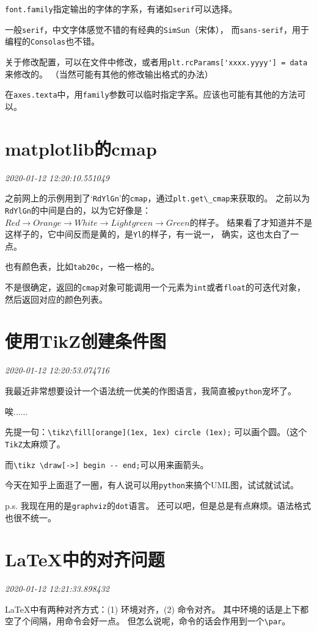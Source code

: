 \documentclass{peterlitsdoc}
\newcommand{\timetx}[1]
    {\par\noindent\emph{\pltgray\small #1}\vspace{2em}}
\newcommand{\vb}{\verb}
\begin{document}
\vb|font.family|指定输出的字体的字系，有诸如\vb|serif|可以选择。

一般\vb|serif|，中文字体感觉不错的有经典的\vb|SimSun|（宋体），
而\vb|sans-serif|，用于编程的\vb|Consolas|也不错。

关于修改配置，可以在文件中修改，或者用\vb|plt.rcParams['xxxx.yyyy'] = data|来修改的。
（当然可能有其他的修改输出格式的办法）

在\vb|axes.texta|中，用\vb|family|参数可以临时指定字系。应该也可能有其他的方法可以。


\section{matplotlib的cmap}\timetx{2020-01-12 12:20:10.551049}

之前网上的示例用到了`\vb|RdYlGn|'的\vb|cmap|，通过\vb|plt.get\_cmap|来获取的。
之前以为\vb|RdYlGn|的中间是白的，以为它好像是：
$Red\to Orange\to White\to Light green\to Green$的样子。
结果看了才知道并不是这样子的，它中间反而是黄的，是\vb|Yl|的样子，有一说一，
确实，这也太白了一点。

也有颜色表，比如\vb|tab20c|，一格一格的。

不是很确定，返回的\vb|cmap|对象可能调用一个元素为\vb|int|或者\vb|float|的可迭代对象，
然后返回对应的颜色列表。


\section{使用TikZ创建条件图}\timetx{2020-01-12 12:20:53.074716}

我最近非常想要设计一个语法统一优美的作图语言，我简直被\vb|python|宠坏了。

唉......

先提一句：\vb|\tikz\fill[orange](1ex, 1ex) circle (1ex);|
可以画个圆。（这个\vb|TikZ|太麻烦了。

而\vb|\tikz \draw[->] begin -- end;|可以用来画箭头。

今天在知乎上面逛了一圈，有人说可以用\vb|python|来搞个UML图，试试就试试。

p.s. 我现在用的是\vb|graphviz|的\vb|dot|语言。
还可以吧，但是总是有点麻烦。语法格式也很不统一。



\section{\LaTeX 中的对齐问题}\timetx{2020-01-12 12:21:33.898432}

\LaTeX 中有两种对齐方式：(1) 环境对齐，(2) 命令对齐。
其中环境的话是上下都空了个间隔，用命令会好一点。
但怎么说呢，命令的话会作用到一个\vb|\par|。
\end{document}
